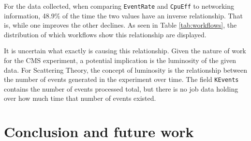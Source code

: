 \documentclass[sigconf]{acmart}
\begin{document}
For the data collected, when comparing \texttt{EventRate} and \texttt{CpuEff} to networking information, 48.9\% of the time the two values have an inverse relationship. That is, while one improves the other declines. As seen in Table \ref{tab:workflows}, the distribution of which workflows show this relationship are displayed. 

It is uncertain what exactly is causing this relationship. Given the nature of work for the CMS experiment, a potential implication is the luminosity of the given data. For Scattering Theory, the concept of luminosity\cite{lumi} is the relationship between the number of events generated in the experiment over time. The field \texttt{KEvents} contains the number of events processed total, but there is no job data holding over how much time that number of events existed.
\section{Conclusion and future work}



 
\end{document}
